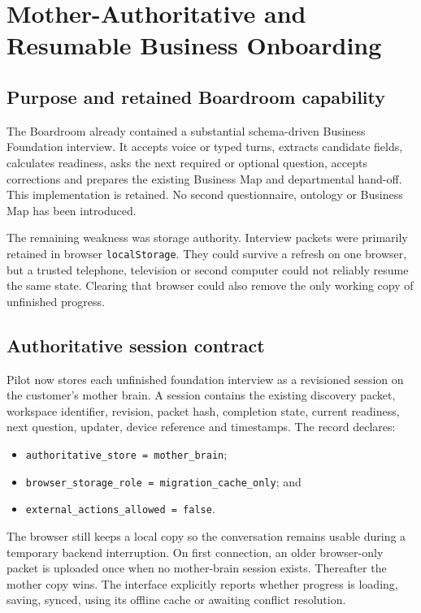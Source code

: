 \section{Mother-Authoritative and Resumable Business Onboarding}
\label{sec:sovereign-resumable-business-onboarding}

\subsection{Purpose and retained Boardroom capability}

The Boardroom already contained a substantial schema-driven Business Foundation
interview.  It accepts voice or typed turns, extracts candidate fields, calculates
readiness, asks the next required or optional question, accepts corrections and
prepares the existing Business Map and departmental hand-off.  This implementation
is retained.  No second questionnaire, ontology or Business Map has been introduced.

The remaining weakness was storage authority.  Interview packets were primarily
retained in browser \texttt{localStorage}.  They could survive a refresh on one
browser, but a trusted telephone, television or second computer could not reliably
resume the same state.  Clearing that browser could also remove the only working
copy of unfinished progress.

\subsection{Authoritative session contract}

Pilot now stores each unfinished foundation interview as a revisioned session on
the customer's mother brain.  A session contains the existing discovery packet,
workspace identifier, revision, packet hash, completion state, current readiness,
next question, updater, device reference and timestamps.  The record declares:

\begin{itemize}
  \item \texttt{authoritative\_store = mother\_brain};
  \item \texttt{browser\_storage\_role = migration\_cache\_only}; and
  \item \texttt{external\_actions\_allowed = false}.
\end{itemize}

The browser still keeps a local copy so the conversation remains usable during a
temporary backend interruption.  On first connection, an older browser-only packet
is uploaded once when no mother-brain session exists.  Thereafter the mother copy
wins.  The interface explicitly reports whether progress is loading, saving,
synced, using its offline cache or awaiting conflict resolution.

